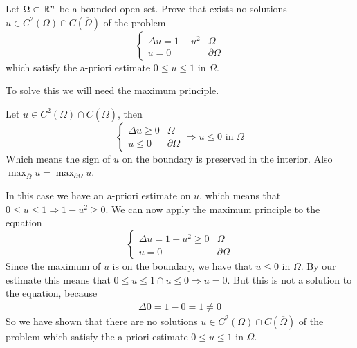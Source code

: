 \newpage
\begin{exercise}
    Let \(\Omega \subset \mathbb{R}^n\) be a bounded open set. Prove that exists no solutions \(u \in C^2(\Omega) \cap C(\overline{\Omega})\) of the problem
    \[
        \begin{cases}
            \Delta u = 1 - u^2 & \Omega \\
            u = 0 & \partial\Omega
        \end{cases}
    \]
    which satisfy the a-priori estimate \(0 \leq u \leq 1\) in \(\Omega\).
\end{exercise}
To solve this we will need the maximum principle. 
\begin{remark}
    Let \(u \in C^2(\Omega) \cap C(\overline{\Omega})\), then 
    \[
        \begin{cases}
            \Delta u \geq 0 & \Omega \\
            u \leq 0 & \partial\Omega
        \end{cases} \Rightarrow u \leq 0 \text{ in } \Omega
    \]
    Which means the sign of \(u\) on the boundary is preserved in the interior. Also \(\max_{\overline{\Omega}} u = \max_{\partial\Omega} u\).
\end{remark}
In this case we have an a-priori estimate on \(u\), which means that \(0 \leq u \leq 1 \Rightarrow 1 - u^2 \geq 0\). We can now apply the maximum principle to the equation
\[
    \begin{cases}
        \Delta u = 1 - u^2 \geq 0 & \Omega \\
        u = 0 & \partial\Omega
    \end{cases}
\]
Since the maximum of \(u\) is on the boundary, we have that \(u \leq 0\) in \(\Omega\). By our estimate this means that \(0 \leq u \leq 1 \cap u \leq 0 \Rightarrow u = 0\). But this is not a solution to the equation, because
\[
    \begin{split}
        \Delta 0 = 1 - 0 = 1 \neq 0
    \end{split}
\]
So we have shown that there are no solutions \(u \in C^2(\Omega) \cap C(\overline{\Omega})\) of the problem which satisfy the a-priori estimate \(0 \leq u \leq 1\) in \(\Omega\).